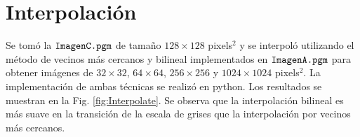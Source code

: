 \documentclass[letterpaper,12pt]{article}
\theoremstyle{plain}
\begin{document}
\section{Interpolación \label{sec:ej3}}

\vspace{0.3cm}

Se tomó la $\verb|ImagenC.pgm|$ de tamaño $128\times128$ pixels$^2$ y se interpoló utilizando el método de vecinos más cercanos y bilineal implementados en $\verb|ImagenA.pgm|$ para obtener imágenes de $32\times32$, $64\times64$, $256\times256$ y $1024\times1024$ pixels$^2$. La implementación de ambas técnicas se realizó en python. Los resultados se muestran en la Fig. \ref{fig:Interpolate}. Se observa que la interpolación bilineal es más suave en la transición de la escala de grises que la interpolación por vecinos más cercanos.
\end{document}
